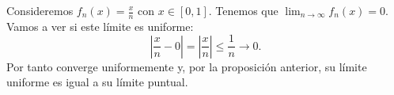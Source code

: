 \begin{eg}
	\normalfont Consideremos $\displaystyle f_{n}\left(x\right) = \frac{x}{n} $ con $\displaystyle x \in \left[0,1\right]  $. Tenemos que $\displaystyle \lim_{n \to \infty}f_{n}\left(x\right) = 0 $. Vamos a ver si este límite es uniforme:
	\[ \left|\frac{x}{n}-0\right| = \left|\frac{x}{n}\right| \leq \frac{1}{n} \to 0 .\]
	Por tanto converge uniformemente y, por la proposición anterior, su límite uniforme es igual a su límite puntual.
\end{eg}

